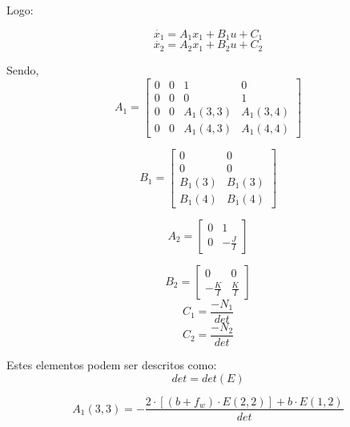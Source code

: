 \documentclass[12pt]{article}
\begin{document}
\quad Logo: 

\begin{equation}
\dot{x_1} = A_1x_1 + B_1u + C_1
\end{equation}
\begin{equation}
\dot{x_2} = A_2x_1 + B_2u + C_2
\end{equation}

\quad Sendo,
\begin{equation}
A_1 = 
\begin{bmatrix}
  0 & 0 & 1 & 0\\
  0 & 0 & 0 & 1\\
  0 & 0 & A_1(3,3) & A_1(3,4)\\
  0 & 0 & A_1(4,3) & A_1(4,4)
\end{bmatrix}
\end{equation}

\begin{equation}
B_1 = 
\begin{bmatrix}
  0 & 0 \\
  0 & 0 \\
  B_1(3) & B_1(3)\\
  B_1(4) & B_1(4)
\end{bmatrix}
\end{equation}

\begin{equation}
A_2 = 
\begin{bmatrix}
  0 & 1 \\
  0 & -\frac{J}{I}
\end{bmatrix}
\end{equation}

\begin{equation}
B_2 = 
\begin{bmatrix}
  0 & 0 \\
  -\frac{K}{I} & \frac{K}{I}
\end{bmatrix}
\end{equation}
\begin{equation}
    C_1 = \frac{-N_1}{det}
\end{equation}
\begin{equation}
    C_2 = \frac{-N_2}{det}
\end{equation}

\quad Estes elementos podem ser descritos como:
\begin{equation}
    det = det(E)
\end{equation}

\begin{equation}
    A_1(3,3) = -\frac{2\cdot[(b + f_w)\cdot E(2,2)]+ b \cdot E(1,2)}{det} 
\end{equation}
\end{document}
